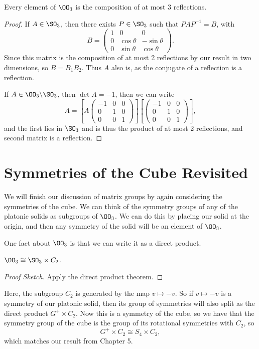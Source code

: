 \documentclass[a4]{scrreprt}
\newcommand{\newsection}{\section}
\begin{document}
\begin{corollary}
	Every element of $\OO_3$ is the composition of at most 3 reflections.
\end{corollary}
\begin{proof}
	If $A \in \SO_3$, then there exists $P \in \SO_3$ such that $PAP^{-1} = B$, with
	$$
	B = \begin{pmatrix}
		1 & 0 & 0 \\
		0 & \cos \theta & - \sin \theta \\
		0 & \sin \theta & \cos \theta
	\end{pmatrix}.
	$$
	Since this matrix is the composition of at most 2 reflections by our result in two dimensions, so $B = B_1 B_2$. Thus $A$ also is, as the conjugate of a reflection is a reflection.

	If $A \in \OO_3 \backslash \SO_3$, then $\det A = -1$, then we can write
	$$
	A = \left[A \begin{pmatrix}
		-1 & 0 & 0 \\
		0 & 1 & 0 \\
		0 & 0 & 1
	\end{pmatrix}\right] \left[\begin{pmatrix}
		-1 & 0 & 0 \\
		0 & 1 & 0 \\
		0 & 0 & 1
	\end{pmatrix}\right],
	$$
	and the first lies in $\SO_3$ and is thus the product of at most 2 reflections, and second matrix is a reflection.
\end{proof}



\newsection{Symmetries of the Cube Revisited}

We will finish our discussion of matrix groups by again considering the symmetries of the cube.
We can think of the symmetry groups of any of the platonic solids as subgroups of $\OO_3$. We can do this by placing our solid at the origin, and then any symmetry of the solid will be an element of $\OO_3$.

One fact about $\OO_3$ is that we can write it as a direct product.

\begin{lemma}
	$\OO_3 \cong \SO_3 \times C_2$.
\end{lemma}
\begin{proof}[Proof Sketch] Apply the direct product theorem.
\end{proof}

Here, the subgroup $C_2$ is generated by the map $v \mapsto -v$. So if $v \mapsto -v$ is a symmetry of our platonic solid, then its group of symmetries will also split as the direct product $G^+ \times C_2$. Now this is a symmetry of the cube, so we have that the symmetry group of the cube is the group of its rotational symmetries with $C_2$, so
$$
G^+ \times C_2 \cong S_4 \times C_2,
$$
which matches our result from Chapter 5.
\end{document}
